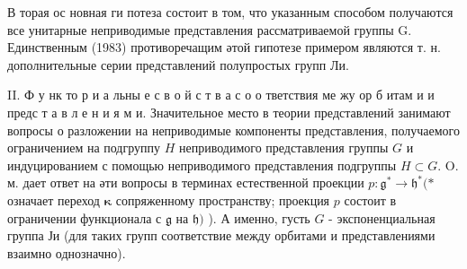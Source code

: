 \documentclass[10pt]{article}
\begin{document}
В торая ос новная ги потеза состоит в том, что указанным способом получаются все унитарные неприводимые представления рассматриваемой группы G. Единственным (1983) противоречащим әтой гипотезе примером являются т. н. дополнительные серии представлений полупростых групп Ли.

II. Ф у нк то р и а льны е с в о й с т в а с о о тветствия ме жу ор б итам и и предс т а в л е н и я м и. Значительное место в теории представлений занимают вопросы о разложении на неприводимые компоненты представления, получаемого ограничением на подгруппу $H$ неприводимого представления группы $G$ и индуцированием с помощью неприводимого представления подгруппы $H \subset G$. O. м. дает ответ на әти вопросы в терминах естественной проекции $p: \mathfrak{g}^{*} \rightarrow \mathfrak{h}^{*}(*$ означает переход $\boldsymbol{\kappa}$ сопряженному пространству; проекция $p$ состоит в ограничении функционала с $\mathfrak{g}$ на $\mathfrak{h})$ ). А именно, густь $G$ - экспоненциальная группа Ји (для таких групп соответствие между орбитами и представлениями взаимно однозначно).
\end{document}
